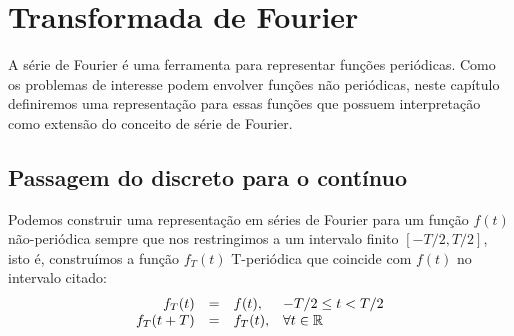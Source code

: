 \chapter{Transformada de Fourier}{\label{trans_Fourier}} %
A série de Fourier é uma ferramenta para representar funções periódicas. Como os problemas de interesse podem envolver fun\c{c}\~{o}es n\~{a}o peri\'{o}dicas, neste cap\'{i}tulo definiremos uma representa\c{c}\~{a}o para essas fun\c{c}\~{o}es que possuem interpreta\c{c}\~{a}o como extens\~{a}o do conceito de s\'{e}rie de Fourier.
\section{Passagem do discreto para o contínuo}
Podemos construir uma representação em séries de Fourier para um função $f(t)$ não-periódica sempre que nos restringimos a um intervalo finito $[-T/2,T/2]$, isto é, construímos a função $f_T(t)$ T-periódica que coincide com $f(t)$ no intervalo citado:
\begin{equation}{\label{T-period}}\begin{array}{rcll}
 f_T(t)&=&f(t),&-T/2\leq t<T/2\\
 f_T(t+T)&=&f_T(t),&\forall t\in \mathbb{R}
 \end{array}
\end{equation}
